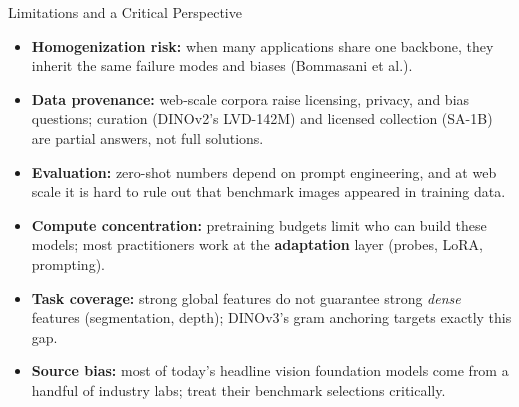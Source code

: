 \begin{frame}{Limitations and a Critical Perspective}
  \begin{itemize}\itemsep0.28em
    \item \textbf{Homogenization risk:} when many applications share one backbone, they inherit the same failure modes and biases (Bommasani et al.).
    \item \textbf{Data provenance:} web-scale corpora raise licensing, privacy, and bias questions; curation (DINOv2's LVD-142M) and licensed collection (SA-1B) are partial answers, not full solutions.
    \item \textbf{Evaluation:} zero-shot numbers depend on prompt engineering, and at web scale it is hard to rule out that benchmark images appeared in training data.
    \item \textbf{Compute concentration:} pretraining budgets limit who can build these models; most practitioners work at the \textbf{adaptation} layer (probes, LoRA, prompting).
    \item \textbf{Task coverage:} strong global features do not guarantee strong \emph{dense} features (segmentation, depth); DINOv3's gram anchoring targets exactly this gap.
    \item \textbf{Source bias:} most of today's headline vision foundation models come from a handful of industry labs; treat their benchmark selections critically.
  \end{itemize}
\end{frame}
